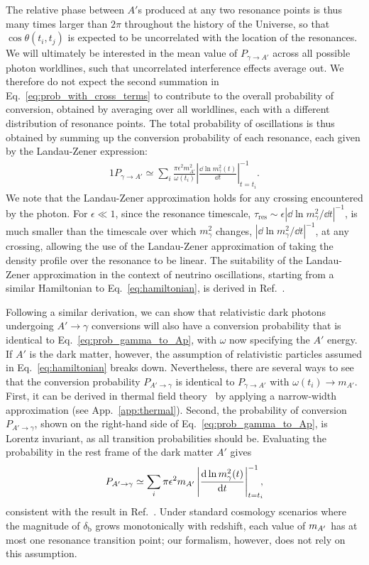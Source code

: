 \documentclass[prd,aps,10pt,nofootinbib,twocolumn,superscriptaddress,preprintnumbers,balancelastpage,longbibliography]{revtex4-1}
\begin{document}
The relative phase between $A'$s produced at any two resonance points is thus many times larger than $2\pi$ throughout the history of the Universe, so that $\cos \theta(t_i,t_j)$ is expected to be uncorrelated with the location of the resonances. 
We will ultimately be interested in the mean value of $P_{\gamma \to A'}$ across all possible photon worldlines, such that uncorrelated interference effects average out.
We therefore do not expect the second summation in Eq.~\eqref{eq:prob_with_cross_terms} to contribute to the overall probability of conversion, obtained by averaging over all worldlines, each with a different distribution of resonance points.
The total probability of oscillations is thus obtained by summing up the conversion probability of each resonance, each given by the Landau-Zener expression:
%
\begin{alignat}{1}
    P_{\gamma \to A'} \simeq \sum_i \frac{\pi \epsilon^2 m_{A'}^2}{\omega(t_i)} \left| \frac{\dd \ln m_\gamma^2(t)}{\dd t} \right|^{-1}_{t = t_i} \!\!\! . 
    \label{eq:prob_gamma_to_Ap}
\end{alignat}
%
We note that the Landau-Zener approximation holds for any crossing encountered by the photon. For $\epsilon \ll 1$, since the resonance timescale, $\tau_\text{res} \sim \epsilon |\dd \ln m_\gamma^2 / \dd t|^{-1}$, is much smaller than the timescale over which $m_\gamma^2$ changes, $|\dd \ln m_\gamma^2 / \dd t|^{-1}$, at any crossing, allowing the use of the Landau-Zener approximation of taking the density profile over the resonance to be linear. The suitability of the Landau-Zener approximation in the context of neutrino oscillations, starting from a similar Hamiltonian to Eq.~\eqref{eq:hamiltonian}, is derived in Ref.~\cite{Petcov:1987xd}. 

Following a similar derivation, we can show that relativistic dark photons undergoing $A' \to \gamma$ conversions will also have a conversion probability that is identical to Eq.~\eqref{eq:prob_gamma_to_Ap}, with $\omega$ now specifying the $A'$ energy. 
If $A'$ is the dark matter, however, the assumption of relativistic particles assumed in Eq.~\eqref{eq:hamiltonian} breaks down. 
Nevertheless, there are several ways to see that the conversion probability $P_{A'\to \gamma}$ is identical to $P_{\gamma \to A'}$ with $\omega(t_i) \to m_{A'}$. 
First, it can be derived in thermal field theory~\cite{Arias:2012az} by applying a narrow-width approximation (see App.~\ref{app:thermal}). 
Second, the probability of conversion $P_{A' \to \gamma}$, shown on the right-hand side of Eq.~\eqref{eq:prob_gamma_to_Ap}, is Lorentz invariant, as all transition probabilities should be. 
Evaluating the probability in the rest frame of the dark matter $A'$ gives
%
\begin{alignat}{1}
    P_{A' \to \gamma} \simeq \sum_i \pi \epsilon^2 m_{A^\prime} \left| \frac{\mathrm{d} \ln m_\gamma^2(t)}{\mathrm{d} t} \right|^{-1}_{t=t_i} \!\!\!,
    \label{eq:prob_Ap_to_gamma}
\end{alignat}
%
consistent with the result in Ref.~\cite{Arias:2012az}. 
Under standard cosmology scenarios where the magnitude of $\delta_\text{b}$ grows monotonically with redshift, each value of $m_{A^\prime}$ has at most one resonance transition point; our formalism, however, does not rely on this assumption. 
\end{document}
